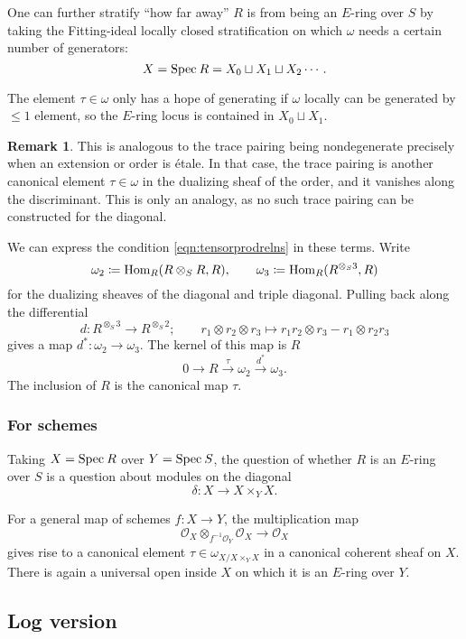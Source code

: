 \documentclass[11pt,reqno]{amsart}
\theoremstyle{definition}
\newtheorem{remark}[theorem]{Remark}
\newcommand{\OO}{\mathcal{O}}
\newcommand{\Spec}{{\rm{Spec}\:}}
\newcommand{\Hom}{{\rm Hom}}
\begin{document}
One can further stratify ``how far away'' $R$ is from being an $E$-ring over $S$ by taking the Fitting-ideal locally closed stratification on which $\omega$ needs a certain number of generators:
\[X = \Spec R = X_0 \sqcup X_1 \sqcup X_2 \cdots .\]

The element $\tau \in \omega$ only has a hope of generating if $\omega$ locally can be generated by $\leq 1$ element, so the $E$-ring locus is contained in $X_0 \sqcup X_1$. 

\begin{remark}
	
This is analogous to the trace pairing being nondegenerate precisely when an extension or order is \'etale. In that case, the trace pairing is another canonical element $\tau \in \omega$ in the dualizing sheaf of the order, and it vanishes along the discriminant. This is only an analogy, as no such trace pairing can be constructed for the diagonal. 

\end{remark}


We can express the condition \eqref{eqn:tensorprodrelns} in these terms. Write 
\[\omega_2 \coloneqq \Hom_R(R \otimes_S R, R), \qquad \omega_3 \coloneqq \Hom_R(R^{\otimes_S 3}, R)\]
for the dualizing sheaves of the diagonal and triple diagonal. Pulling back along the differential
\[d : R^{\otimes_S 3} \to R^{\otimes_S 2}; \qquad r_1 \otimes r_2 \otimes r_3 \mapsto r_1 r_2 \otimes r_3 - r_1 \otimes r_2 r_3\]
gives a map $d^* : \omega_2 \to \omega_3$. The kernel of this map is $R$
\[0 \to R \overset{\tau}{\longrightarrow} \omega_2 \overset{d^*}{\longrightarrow} \omega_3.\]
The inclusion of $R$ is the canonical map $\tau$. 


\subsubsection{For schemes}


Taking $X = \Spec R$ over $Y = \Spec S$, the question of whether $R$ is an $E$-ring over $S$ is a question about modules on the diagonal
\[\delta : X \to X \times_Y X.\]

For a general map of schemes $f : X \to Y$, the multiplication map
\[\OO_X \otimes_{f^{-1}\OO_Y} \OO_X \to \OO_X\]
gives rise to a canonical element $\tau \in \omega_{X/X \times_Y X}$ in a canonical coherent sheaf on $X$. There is again a universal open inside $X$ on which it is an $E$-ring over $Y$. 




\subsection{Log version}
\end{document}
